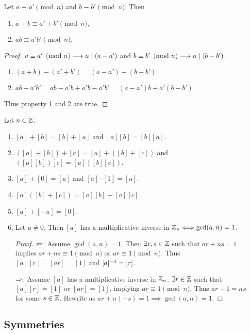 \documentclass[]{article}
\begin{document}
\begin{lemma}
	Let $a\equiv a'\pmod n$ and $b\equiv b'\pmod n$. Then
	\begin{enumerate}
		\item $a+b \equiv a'+b'\pmod n$,
		\item $ab \equiv a'b'\pmod n$.
	\end{enumerate}
\end{lemma}
\begin{proof}
	$a\equiv a'\pmod n \longrightarrow n\mid (a-a')$ and $b\equiv b'\pmod n \longrightarrow n\mid(b-b')$.
	\begin{enumerate}
		\item $(a+b) - (a'+b') = (a-a') + (b-b')$
		\item $ab-a'b' = ab-a'b+a'b-a'b' = (a-a')b + a'(b-b')$
	\end{enumerate}
	Thus property 1 and 2 are true.
\end{proof}
\begin{proposition}
	Let $n\in\mathbb{Z}$.
	\begin{enumerate}
		\item $[a]+[b] = [b] + [a]$ and $[a][b] = [b][a]$.
		\item $([a]+[b])+[c] = [a] + ([b]+[c])$ and $([a][b])[c] = [a]([b][c])$.
		\item $[a]+[0] = [a]$ and $[a]\cdot [1] =[a]$.
		\item $[a]([b]+[c]) = [a][b] + [a][c]$.
		\item $[a]+[-a] = [0]$.
		\item Let $a\neq 0$. Then $[a]$ has a multiplicative inverse in $\mathbb{Z}_n \Longleftrightarrow \gcd(a,n) = 1$.
		\begin{proof}
			\ul{$\Leftarrow$}: Assume $\gcd(a,n) = 1$. Then $\exists r,s\in\mathbb{Z}$ such that $ar+ns = 1$ implies $ar+ns \equiv 1\pmod n$ or $ar\equiv 1\pmod n$. Thus $[a][r] = [ar] = [1]$ and $[a]^{-1} = [r]$.

			\ul{$\Rightarrow$}: Assume $[a]$ has a multiplicative inverse in $\mathbb{Z}_n$: $\exists r\in\mathbb{Z}$ such that $[a][r] = [1]$ or $[ar] = [1]$, implying $ar\equiv 1\pmod n$. Thus $ar-1 = ns$ for some $s\in\mathbb{Z}$. Rewrite as $ar+n(-s) = 1 \implies \gcd(a,n) = 1$.
		\end{proof}
	\end{enumerate}
\end{proposition}

\subsection{Symmetries}
\end{document}
